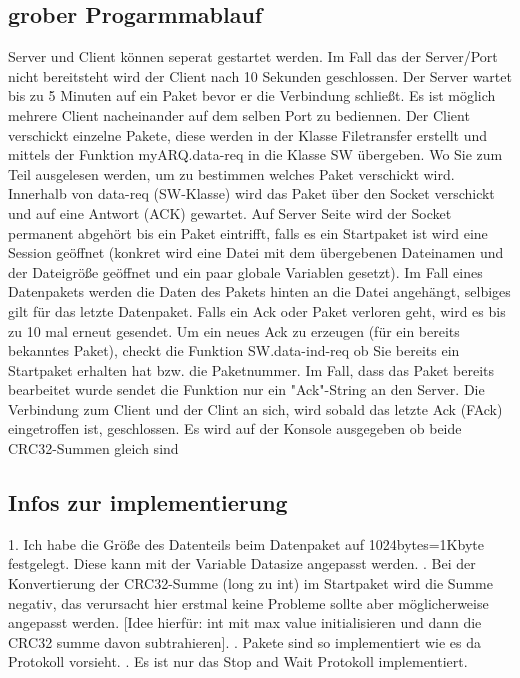 \documentclass {article}[a4paper,12pt]
\begin{document}
\subsection{grober Progarmmablauf}
Server und Client können seperat gestartet werden. Im Fall das der Server/Port nicht bereitsteht
wird der Client nach 10 Sekunden geschlossen. 
\newline
Der Server wartet bis zu 5 Minuten auf ein Paket bevor er die Verbindung schließt.  
Es ist möglich mehrere Client nacheinander auf dem selben Port zu bediennen.
\newline
Der Client verschickt einzelne Pakete, diese werden in der Klasse Filetransfer erstellt und mittels der Funktion
myARQ.data-req in die Klasse SW übergeben. Wo Sie zum Teil ausgelesen werden, um zu bestimmen welches Paket verschickt wird.
\newline
Innerhalb von data-req (SW-Klasse) wird das Paket über den Socket verschickt und auf eine Antwort (ACK) gewartet.
\newline
\newline
Auf Server Seite wird der Socket permanent abgehört bis ein Paket eintrifft, falls es ein Startpaket ist 
wird eine Session geöffnet (konkret wird eine Datei mit dem übergebenen Dateinamen und der Dateigröße geöffnet und ein paar globale Variablen gesetzt).
\newline
Im Fall eines  Datenpakets werden die Daten des Pakets hinten an die Datei angehängt,
selbiges gilt für das letzte Datenpaket.
\newline 
Falls ein Ack oder Paket verloren geht, wird es bis zu 10 mal erneut gesendet.
\newline
Um ein neues Ack zu erzeugen (für ein bereits bekanntes Paket), checkt die Funktion SW.data-ind-req ob Sie 
bereits ein Startpaket erhalten hat bzw. die Paketnummer.
Im Fall, dass das Paket bereits bearbeitet wurde sendet die Funktion nur ein "Ack"-String an den Server.
\newline
Die Verbindung zum Client und der Clint an sich, wird sobald das letzte Ack (FAck) eingetroffen ist, geschlossen.
Es wird auf der Konsole ausgegeben ob beide CRC32-Summen gleich sind
\newline

\subsection{Infos zur  implementierung}

1. Ich habe die Größe des Datenteils beim Datenpaket auf 1024bytes=1Kbyte festgelegt.
Diese kann mit der Variable Datasize angepasst werden.
. Bei der Konvertierung der CRC32-Summe (long zu int) im Startpaket wird  die Summe negativ, 
das verursacht hier erstmal keine Probleme sollte aber möglicherweise angepasst  werden.
[Idee hierfür: int mit max value initialisieren und dann die CRC32 summe davon subtrahieren].
. Pakete sind so implementiert wie es da Protokoll vorsieht.
. Es ist nur das Stop and Wait Protokoll implementiert.
\newline
\end{document}
